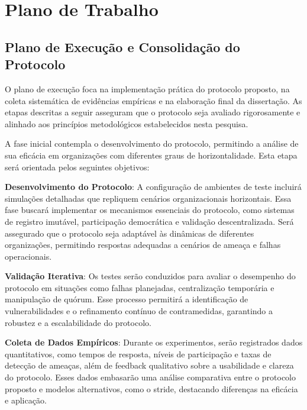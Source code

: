 
%

\chapter{Plano de Trabalho}
\label{cha:work_plan}

\glsresetall
{}

\section{Plano de Execução e Consolidação do Protocolo}
\label{sec:execution_plan}

O plano de execução foca na implementação prática do protocolo proposto, na
coleta sistemática de evidências empíricas e na elaboração final da dissertação.
As etapas descritas a seguir asseguram que o protocolo seja avaliado
rigorosamente e alinhado aos princípios metodológicos estabelecidos nesta
pesquisa.

A fase inicial contempla o desenvolvimento do protocolo, permitindo a análise de
sua eficácia em organizações com diferentes graus de horizontalidade. Esta etapa
será orientada pelos seguintes objetivos:

\textbf{Desenvolvimento do Protocolo}: A configuração de ambientes de teste
incluirá simulações detalhadas que repliquem cenários organizacionais
horizontais. Essa fase buscará implementar os mecanismos essenciais do
protocolo, como sistemas de registro imutável, participação democrática e
validação descentralizada. Será assegurado que o protocolo seja adaptável às
dinâmicas de diferentes organizações, permitindo respostas adequadas a cenários
de ameaça e falhas operacionais.

\textbf{Validação Iterativa}: Os testes serão conduzidos para avaliar o
desempenho do protocolo em situações como falhas planejadas, centralização
temporária e manipulação de quórum. Esse processo permitirá a identificação de
vulnerabilidades e o refinamento contínuo de contramedidas, garantindo a
robustez e a escalabilidade do protocolo.

\textbf{Coleta de Dados Empíricos}: Durante os experimentos, serão registrados
dados quantitativos, como tempos de resposta, níveis de participação e taxas de
detecção de ameaças, além de feedback qualitativo sobre a usabilidade e clareza
do protocolo. Esses dados embasarão uma análise comparativa entre o protocolo
proposto e modelos alternativos, como o \gls{stride}, destacando diferenças na
eficácia e aplicação.

